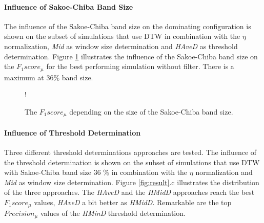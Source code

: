 
\paragraph{Influence of Sakoe-Chiba Band Size} The influence of the Sakoe-Chiba band size on the dominating
configuration is shown on the subset of simulations that use DTW in combination with the $\eta$ normalization,
\textit{Mid} as window size determination and \textit{HAveD} as threshold determination. Figure
\ref{fig:sakoe-chiba_band_result} illustrates the influence of the Sakoe-Chiba band size on the $F_{1}score_{\mu}$ for
the best performing simulation without filter. There is a maximum at 36\% band size.

\begin{figure}
    \begin{minipage}{0.55\textwidth}
        \resizebox {\textwidth} {!} {
        }
    \end{minipage}\hfill
    \begin{minipage}{0.4\textwidth}
        \caption{The $F_{1}score_{\mu}$ depending on the size of the Sakoe-Chiba band size.}
        \label{fig:sakoe-chiba_band_result}
    \end{minipage}
\end{figure}

\paragraph{Influence of Threshold Determination} Three different threshold determinations approaches are tested. The
influence of the threshold determination is shown on the subset of simulations that use DTW with Sakoe-Chiba band size
36 \% in combination with the $\eta$ normalization and \textit{Mid} as window size determination. Figure
\ref{fig:result}.c illustrates the distribution of the three approaches. The \textit{HAveD} and the
\textit{HMidD} approaches reach the best $F_{1}score_{\mu}$ values, \textit{HAveD} a bit better as \textit{HMidD}.
Remarkable are the top $Precision_{\mu}$ values of the \textit{HMinD} threshold determination.

